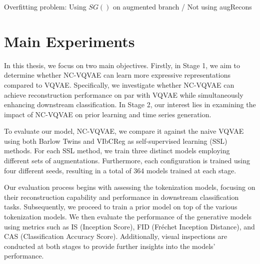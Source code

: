 \documentclass[../../thesis.tex]{subfiles}
\begin{document}
Overfitting problem: Using $SG()$ on augmented branch / Not using augRecons \newline

\section{Main Experiments}




In this thesis, we focus on two main objectives. Firstly, in Stage 1, we aim to determine whether NC-VQVAE can learn more expressive representations compared to VQVAE. Specifically, we investigate whether NC-VQVAE can achieve reconstruction performance on par with VQVAE while simultaneously enhancing downstream classification. In Stage 2, our interest lies in examining the impact of NC-VQVAE on prior learning and time series generation.\newline

To evaluate our model, NC-VQVAE, we compare it against the naive VQVAE using both Barlow Twins and VIbCReg as self-supervised learning (SSL) methods. For each SSL method, we train three distinct models employing different sets of augmentations. Furthermore, each configuration is trained using four different seeds, resulting in a total of 364 models trained at each stage.\newline

Our evaluation process begins with assessing the tokenization models, focusing on their reconstruction capability and performance in downstream classification tasks. Subsequently, we proceed to train a prior model on top of the various tokenization models. We then evaluate the performance of the generative models using metrics such as IS (Inception Score), FID (Fréchet Inception Distance), and CAS (Classification Accuracy Score). Additionally, visual inspections are conducted at both stages to provide further insights into the models' performance.\newline
\end{document}
